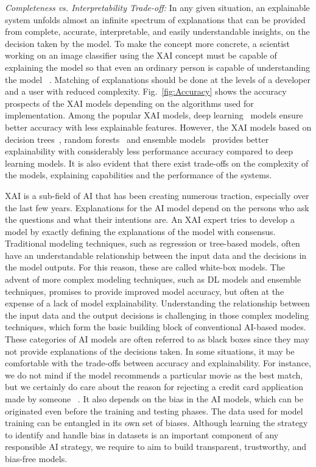 \documentclass[journal]{IEEEtran}
\begin{document}
\textit{Completeness vs. Interpretability Trade-off: } In any given situation, an explainable system unfolds almost an infinite spectrum of explanations that can be provided from complete, accurate, interpretable, and easily understandable insights, on the decision taken by the model. To make the concept more concrete, a scientist working on an image classifier using the XAI concept must be capable of explaining the model so that even an ordinary person is capable of understanding the model ~\cite{van2022explainable}. Matching of explanations should be done at the levels of a developer and a user with reduced complexity. Fig.~\ref{fig:Accuracy} shows the accuracy prospects of the XAI models depending on the algorithms used for implementation. Among the popular XAI models, deep learning~\cite{nascita2021xai} models ensure better accuracy with less explainable features. However, the XAI models based on decision trees~\cite{mahbooba2021explainable}, random forests~\cite{hatwell2020chirps} and ensemble models~\cite{zou2022ensemble} provides better explainability with considerably less performance accuracy compared to deep learning models. It is also evident that there exist trade-offs on the complexity of the models, explaining capabilities and the performance of the systems.

XAI is a sub-field of AI that has been creating numerous traction, especially over the last few years. Explanations for the AI model depend on the persons who ask the questions and what their intentions are. An XAI expert tries to develop a model by exactly defining the explanations of the model with consensus. Traditional modeling techniques, such as regression or tree-based models, often have an understandable relationship between the input data and the decisions in the model outputs. For this reason, these are called white-box models. The advent of more complex modeling techniques, such as DL models and ensemble techniques, promises to provide improved model accuracy, but often at the expense of a lack of model explainability. Understanding the relationship between the input data and the output decisions is challenging in those complex modeling techniques, which form the basic building block of conventional AI-based modes. These categories of AI models are often referred to as black boxes since they may not provide explanations of the decisions taken. In some situations, it may be comfortable with the trade-offs between accuracy and explainability. For instance, we do not mind if the model recommends a particular movie as the best match, but we certainly do care about the reason for rejecting a credit card application made by someone ~\cite{kute2021deep}. It also depends on the bias in the AI models, which can be originated even before the training and testing phases. The data used for model training can be entangled in its own set of biases. Although learning the strategy to identify and handle bias in datasets is an important component of any responsible AI strategy, we require to aim to build transparent, trustworthy, and bias-free models.
\end{document}
